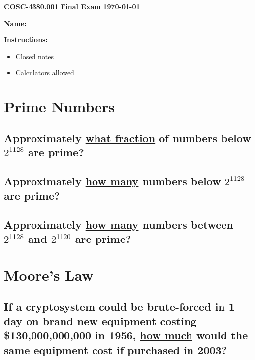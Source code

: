 \documentclass[12pt]{article}
\begin{document}
\noindent \Large \textbf{COSC-4380.001}  \hfill \textbf{Final Exam}  \hfill \textbf{\today}\\

\vspace{0cm}

\textbf{Name:}
\hrulefill

\vspace{0.2cm}
\Large
\textbf{Instructions:}
\begin{itemize}
    \item Closed notes
    \item Calculators allowed
\end{itemize}


\section{Prime Numbers}

\subsection{Approximately \underline{what fraction} of numbers below $2^{1128}$ are prime?}

\vspace{7cm}

\subsection{Approximately \underline{how many} numbers below $2^{1128}$ are prime?}

\newpage

\subsection{Approximately \underline{how many} numbers between $2^{1128}$ and $2^{1120}$ are prime?}

\vspace{8cm}

\section{Moore's Law}

\subsection{If a cryptosystem could be brute-forced in 1 day on brand new equipment costing \$130,000,000,000 in 1956, \underline{how much} would the same equipment cost if purchased in 2003?}
\end{document}
